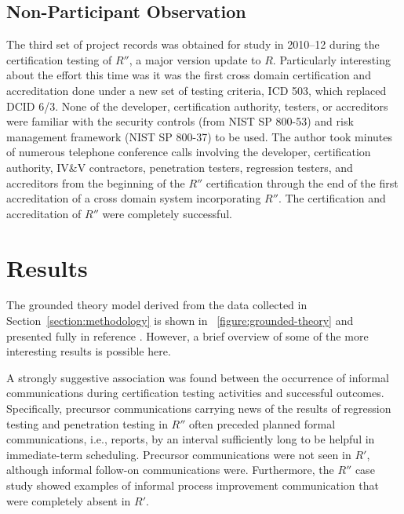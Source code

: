 \documentclass[10pt,letterpaper,conference]{IEEEtran}
\begin{document}
\subsection{Non-Participant Observation}

The third set of project records was obtained for study in 2010--12 during the certification
testing of $R''$, a major version update to $R$. Particularly interesting about the effort this
time was it was the first cross domain certification and accreditation done under a new set of
testing criteria, ICD 503, which replaced DCID 6/3. None of the developer, certification authority,
testers, or accreditors were familiar with the security controls (from NIST SP 800-53) and risk
management framework (NIST SP 800-37) to be used. The author took minutes of numerous telephone
conference calls involving the developer, certification authority, IV\&V contractors, penetration
testers, regression testers, and accreditors from the beginning of the $R''$ certification through
the end of the first accreditation of a cross domain system incorporating $R''$. The certification
and accreditation of $R''$ were completely successful.

\section{Results}

The grounded theory model derived from the data collected in Section~\ref{section:methodology}
is shown in \figurename~\ref{figure:grounded-theory} and presented fully in reference
\cite{Loughry2012b}. However, a brief overview of some of the more interesting results is
possible here.

A strongly suggestive association was found between the occurrence of informal communications
during certification testing activities and successful outcomes. Specifically, precursor
communications carrying news of the results of regression testing and penetration testing in $R''$
often preceded planned formal communications, i.e., reports, by an interval sufficiently long to be
helpful in immediate-term scheduling. Precursor communications were not seen in $R'$, although
informal follow-on communications were. Furthermore, the $R''$ case study showed
examples of informal process improvement communication that were completely absent in $R'$.
\end{document}
